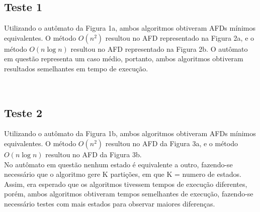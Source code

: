 \documentclass[12pt]{article}
\begin{document}
\subsection{Teste 1}

Utilizando o autômato da Figura 1a, ambos algoritmos obtiveram AFDs mínimos equivalentes. O método $O(n^2)$ resultou no AFD representado na Figura 2a, e o método $O(n \log{} n)$ resultou no AFD representado na Figura 2b.
O autômato em questão representa um caso médio, portanto, ambos algoritmos obtiveram resultados semelhantes em tempo de execução.

\begin{figure}[ht]
  \centering
  \\
\end{figure}

\subsection{Teste 2}
Utilizando o autômato da Figura 1b, ambos algoritmos obtiveram AFDs mínimos equivalentes. O método $O(n^2)$ resultou no AFD da Figura 3a, e o método $O(n\log{}n)$ resultou no AFD da Figura 3b.
\\
No autômato em questão nenhum estado é equivalente a outro, fazendo-se necessário que o algoritmo gere K partições, em que K = numero de estados. Assim, era esperado que os algoritmos tivessem tempos de execução diferentes, porém, ambos algoritmos obtiveram tempos semelhantes de execução, fazendo-se necessário testes com mais estados para observar maiores diferenças.
\\ 
\\ 
\\ 
\\
\\
\\
\\
\\
\end{document}
